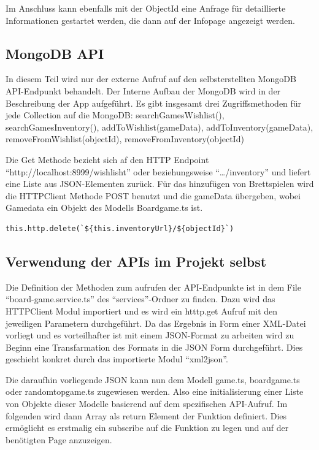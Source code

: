 Im Anschluss kann ebenfalls mit der ObjectId eine Anfrage für detaillierte Informationen gestartet werden, die dann auf der Infopage angezeigt werden. 

\subsection{MongoDB API}

In diesem Teil wird nur der externe Aufruf auf den selbsterstellten MongoDB API-Endpunkt behandelt. 
Der Interne Aufbau der MongoDB wird in der Beschreibung der App aufgeführt. Es gibt insgesamt drei Zugriffsmethoden für jede Collection auf die MongoDB: 
searchGamesWishlist(), searchGamesInventory(), addToWishlist(gameData), addToInventory(gameData), removeFromWishlist(objectId), removeFromInventory(objectId)\bigskip


Die Get Methode bezieht sich af den HTTP Endpoint ``http://localhost:8999/wishlisht'' oder beziehungsweise ``\ldots/inventory'' und liefert eine Liste aus JSON-Elementen zurück.
Für das hinzufügen von Brettspielen wird die HTTPClient Methode POST benutzt und die gameData übergeben, wobei Gamedata ein Objekt des Modells Boardgame.ts ist. 

\begin{center}
    \begin{lstlisting}[caption={Löschaufruf der MongoDB API}, label=lst:jscode]
    this.http.delete(`${this.inventoryUrl}/${objectId}`)
\end{lstlisting}
\end{center}


\subsection{Verwendung der APIs im Projekt selbst}

Die Definition der Methoden zum aufrufen der API-Endpunkte ist in dem   File ``board-game.service.ts'' des ``services''-Ordner zu finden.
Dazu wird das HTTPClient Modul importiert und es wird ein htttp.get Aufruf mit den jeweiligen Parametern durchgeführt. Da das Ergebnis in Form einer XML-Datei vorliegt und es vorteilhafter ist mit einem JSON-Format zu arbeiten wird zu Beginn eine Transfarmation des Formats in die JSON Form durchgeführt.
Dies geschieht konkret durch das importierte Modul ``xml2json''. \bigskip 

Die daraufhin vorliegende JSON kann nun dem Modell game.ts, boardgame.ts oder randomtopgame.ts zugewiesen werden. Also eine initialisierung einer Liste von Objekte dieser Modelle basierend auf dem spezifischen API-Aufruf.
Im folgenden wird dann Array als return Element der Funktion definiert. Dies ermöglicht es erstmalig ein subscribe auf die Funktion zu legen und auf der benötigten Page anzuzeigen. \bigskip 

